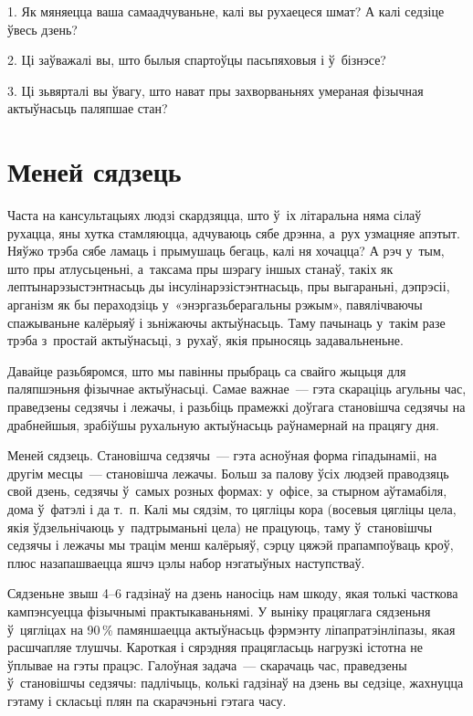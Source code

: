 1. Як мяняецца ваша самаадчуваньне, калі вы рухаецеся шмат? А калі седзіце ўвесь дзень?

2. Ці заўважалі вы, што былыя спартоўцы пасьпяховыя і ў~бізнэсе?

3. Ці зьвярталі вы ўвагу, што нават пры захворваньнях умераная фізычная актыўнасьць паляпшае стан?


\section{Меней сядзець}

Часта на кансультацыях людзі скардзяцца, што ў~іх літаральна няма сілаў рухацца, яны хутка стамляюцца, адчуваюць сябе дрэнна, а~рух узмацняе апэтыт. Няўжо трэба сябе ламаць і прымушаць бегаць, калі ня хочацца? А рэч у~тым, што пры атлусьценьні, а~таксама пры шэрагу іншых станаў, такіх як лептынарэзыстэнтнасьць ды інсулінарэзістэнтнасьць, пры выгараньні, дэпрэсіі, арганізм як бы пераходзіць у~«энэргазьберагальны рэжым», павялічваючы спажываньне калёрыяў і зьніжаючы актыўнасьць. Таму пачынаць у~такім разе трэба з~простай актыўнасьці, з~рухаў, якія прыносяць задавальненьне.

Давайце разьбяромся, што мы павінны прыбраць са свайго жыцьця для паляпшэньня фізычнае актыўнасьці. Самае важнае~--- гэта скараціць агульны час, праведзены седзячы і лежачы, і разьбіць прамежкі доўгага становішча седзячы на драбнейшыя, зрабіўшы рухальную актыўнасьць раўнамернай на працягу дня.

Меней сядзець. Становішча седзячы~--- гэта асноўная форма гіпадынаміі, на другім месцы~--- становішча лежачы. Больш за палову ўсіх людзей праводзяць свой дзень, седзячы ў~самых розных формах: у~офісе, за стырном аўтамабіля, дома ў~фатэлі і да т.~п. Калі мы сядзім, то цягліцы кора (восевыя цягліцы цела, якія ўдзельнічаюць у~падтрыманьні цела) не працуюць, таму ў~становішчы седзячы і лежачы мы трацім менш калёрыяў, сэрцу цяжэй прапампоўваць кроў, плюс назапашваецца яшчэ цэлы набор нэгатыўных наступстваў.

Сядзеньне звыш 4--6 гадзінаў на дзень наносіць нам шкоду, якая толькі часткова кампэнсуецца фізычнымі практыкаваньнямі. У выніку працяглага сядзеньня ў~цягліцах на 90\,\% памяншаецца актыўнасьць фэрмэнту ліпапратэінліпазы, якая расшчапляе тлушчы. Кароткая і сярэдняя працягласьць нагрузкі істотна не ўплывае на гэты працэс. Галоўная задача~--- скарачаць час, праведзены ў~становішчы седзячы: падлічыць, колькі гадзінаў на дзень вы седзіце, жахнуцца гэтаму і скласьці плян па скарачэньні гэтага часу.

